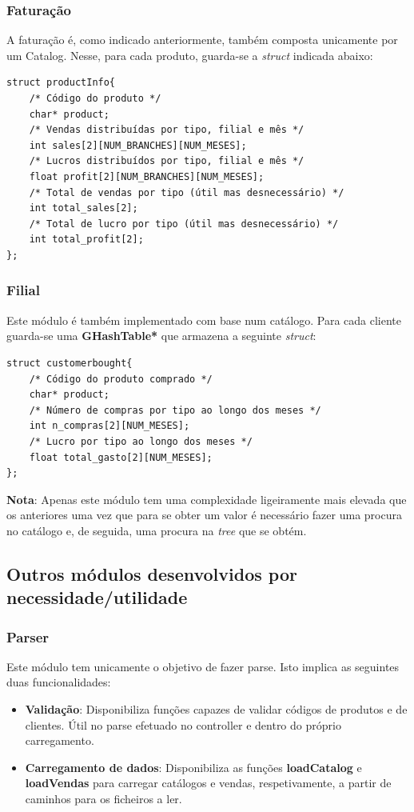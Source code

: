 \documentclass[11pt]{article}
\begin{document}
\subsubsection{Faturação}
A faturação é, como indicado anteriormente, também composta unicamente por um Catalog. Nesse, para cada produto, guarda-se a \textit{struct} indicada abaixo:

\begin{verbatim}
struct productInfo{
    /* Código do produto */
    char* product;
    /* Vendas distribuídas por tipo, filial e mês */
    int sales[2][NUM_BRANCHES][NUM_MESES];
    /* Lucros distribuídos por tipo, filial e mês */
    float profit[2][NUM_BRANCHES][NUM_MESES];
    /* Total de vendas por tipo (útil mas desnecessário) */
    int total_sales[2];
    /* Total de lucro por tipo (útil mas desnecessário) */
    int total_profit[2];
};
\end{verbatim}

\subsubsection{Filial}
Este módulo é também implementado com base num catálogo. Para cada cliente guarda-se uma \textbf{GHashTable*} que armazena a seguinte \textit{struct}:

\begin{verbatim}
struct customerbought{
    /* Código do produto comprado */
    char* product;
    /* Número de compras por tipo ao longo dos meses */
    int n_compras[2][NUM_MESES];
    /* Lucro por tipo ao longo dos meses */
    float total_gasto[2][NUM_MESES];
};
\end{verbatim}

\textbf{Nota}: Apenas este módulo tem uma complexidade ligeiramente mais elevada que os anteriores uma vez que para se obter um valor é necessário fazer uma procura no catálogo e, de seguida, uma procura na \textit{tree} que se obtém.

\newpage
\subsection{Outros módulos desenvolvidos por necessidade/utilidade}
\subsubsection{Parser}
Este módulo tem unicamente o objetivo de fazer parse. Isto implica as seguintes duas funcionalidades:
\begin{itemize}
    \item \textbf{Validação}: Disponibiliza funções capazes de validar códigos de produtos e de clientes. Útil no parse efetuado no controller e dentro do próprio carregamento.
    \item \textbf{Carregamento de dados}: Disponibiliza as funções \textbf{loadCatalog} e \textbf{loadVendas} para carregar catálogos e vendas, respetivamente, a partir de caminhos para os ficheiros a ler.
\end{itemize}
\end{document}
